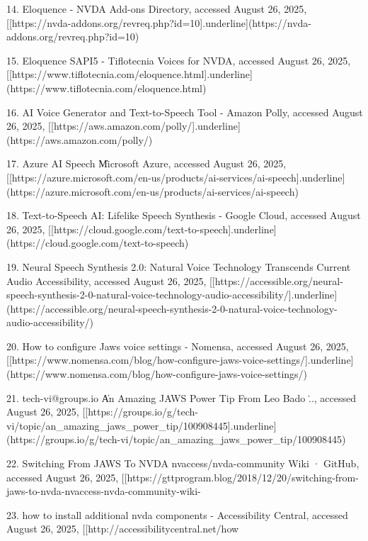 14. Eloquence - NVDA Add-ons Directory, accessed August 26, 2025,
    [[https://nvda-addons.org/revreq.php?id=10]{.underline}](https://nvda-addons.org/revreq.php?id=10)

15. Eloquence SAPI5 - Tiflotecnia Voices for NVDA, accessed August 26,
    2025,
    [[https://www.tiflotecnia.com/eloquence.html]{.underline}](https://www.tiflotecnia.com/eloquence.html)

16. AI Voice Generator and Text-to-Speech Tool - Amazon Polly, accessed
    August 26, 2025,
    [[https://aws.amazon.com/polly/]{.underline}](https://aws.amazon.com/polly/)

17. Azure AI Speech \| Microsoft Azure, accessed August 26, 2025,
    [[https://azure.microsoft.com/en-us/products/ai-services/ai-speech]{.underline}](https://azure.microsoft.com/en-us/products/ai-services/ai-speech)

18. Text-to-Speech AI: Lifelike Speech Synthesis - Google Cloud,
    accessed August 26, 2025,
    [[https://cloud.google.com/text-to-speech]{.underline}](https://cloud.google.com/text-to-speech)

19. Neural Speech Synthesis 2.0: Natural Voice Technology Transcends
    Current Audio Accessibility, accessed August 26, 2025,
    [[https://accessible.org/neural-speech-synthesis-2-0-natural-voice-technology-audio-accessibility/]{.underline}](https://accessible.org/neural-speech-synthesis-2-0-natural-voice-technology-audio-accessibility/)

20. How to configure Jaws voice settings - Nomensa, accessed August 26,
    2025,
    [[https://www.nomensa.com/blog/how-configure-jaws-voice-settings/]{.underline}](https://www.nomensa.com/blog/how-configure-jaws-voice-settings/)

21. tech-vi@groups.io \| An Amazing JAWS Power Tip From Leo Bado \...,
    accessed August 26, 2025,
    [[https://groups.io/g/tech-vi/topic/an_amazing_jaws_power_tip/100908445]{.underline}](https://groups.io/g/tech-vi/topic/an_amazing_jaws_power_tip/100908445)

22. Switching From JAWS To NVDA nvaccess/nvda-community Wiki · GitHub,
    accessed August 26, 2025,
    [[https://gttprogram.blog/2018/12/20/switching-from-jaws-to-nvda-nvaccess-nvda-community-wiki-%

23. how to install additional nvda components - Accessibility Central,
    accessed August 26, 2025,
    [[http://accessibilitycentral.net/how%
